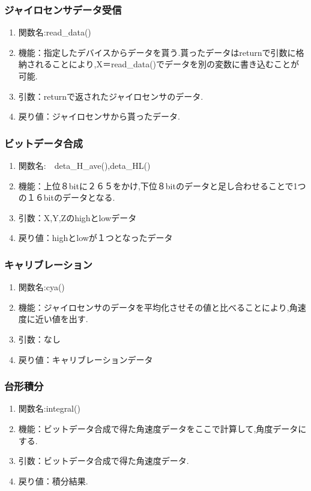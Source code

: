 \documentclass[12pt,oneside]{paper}
\begin{document}
\subsubsection{ジャイロセンサデータ受信}

\begin{enumerate}
\item 関数名:read\_data()
\item 機能：指定したデバイスからデータを貰う.貰ったデータはreturnで引数に格納されることにより,X＝read\_data()でデータを別の変数に書き込むことが可能.	
\item 引数：returnで返されたジャイロセンサのデータ.
\item 戻り値：ジャイロセンサから貰ったデータ.
\end{enumerate}

\subsubsection{ビットデータ合成}

\begin{enumerate}
\item 関数名:　deta\_H\_ave(),deta\_HL()
\item 機能：上位８bitに２６５をかけ,下位８bitのデータと足し合わせることで1つの１６bitのデータとなる.
\item 引数：X,Y,Zのhighとlowデータ
\item 戻り値：highとlowが１つとなったデータ
\end{enumerate}

\subsubsection{キャリブレーション}

\begin{enumerate}
\item 関数名:cya()
\item 機能：ジャイロセンサのデータを平均化させその値と比べることにより,角速度に近い値を出す.
\item 引数：なし
\item 戻り値：キャリブレーションデータ
\end{enumerate}

\subsubsection{台形積分}

\begin{enumerate}
\item 関数名:integral()
\item 機能：ビットデータ合成で得た角速度データをここで計算して,角度データにする.
\item 引数：ビットデータ合成で得た角速度データ.
\item 戻り値：積分結果.
\end{enumerate}
\end{document}
